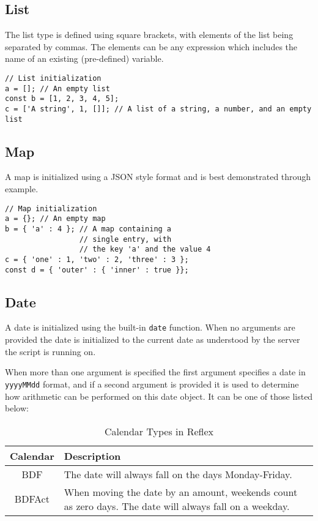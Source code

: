 \subsection{List}
The list  type is defined using square brackets, with elements of the list being separated by commas. The elements can be any expression which includes the name of an existing (pre-defined) variable.
\begin{lstlisting}[caption={List initialization}]
// List initialization
a = []; // An empty list
const b = [1, 2, 3, 4, 5];
c = ['A string', 1, []]; // A list of a string, a number, and an empty list
\end{lstlisting}
\subsection{Map}
A map  is initialized using a JSON style format and is best demonstrated through example.
\begin{lstlisting}[caption={Map initialization}]
// Map initialization
a = {}; // An empty map
b = { 'a' : 4 }; // A map containing a
                 // single entry, with
                 // the key 'a' and the value 4
c = { 'one' : 1, 'two' : 2, 'three' : 3 };
const d = { 'outer' : { 'inner' : true }};
\end{lstlisting}
\subsection{Date}
A date  is initialized using the built-in \Verb+date+ function. When no arguments are provided the date is
initialized to the current date as understood by the server the script is running on.

When more than one argument is specified the first argument specifies a date in \Verb+yyyyMMdd+ format, and if a second
argument is provided it is used to determine how arithmetic can be performed on this date object. It can be one of those listed below:

\begin{table}[h!]
\small
\centering
\begin{tabular} { | c | p{7cm} | }
\hline
Calendar & Description \\
\hline
BDF & The date will always fall on the days Monday-Friday. \\
BDFAct & When moving the date by an amount, weekends count as zero days. The date will always fall on a weekday. \\
\hline
\end{tabular}
\label{tab:DateCalendarTypes}
\caption{Calendar Types in Reflex}
\end{table}

